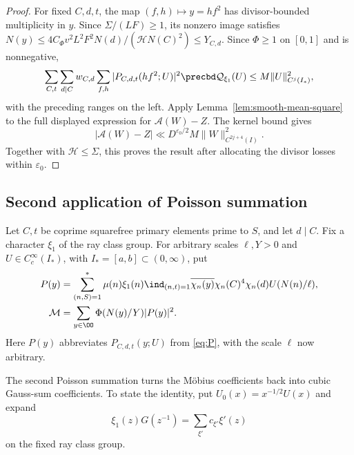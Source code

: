 \begin{proof}
For fixed $C,d,t$, the map $(f,h)\mapsto y=hf^2$ has
divisor-bounded multiplicity in $y$. Since $\Sigma/(LF)\ge1$, its
nonzero image satisfies
$N(y)\le4C_\Phi v^2L^2F^2N(d)/(\mathcal H N(C)^2)\le Y_{C,d}$.
Since $\Phi\ge1$ on $[0,1]$ and is nonnegative,
\[
 \sum_{C,t}\sum_{d\mid C}w_{C,d}\sum_{f,h}|P_{C,d,t}(hf^2;U)|^2
 \precbd\mathcal Q_{\xi_1}(U)
 \le M\|U\|_{C^j(I_*)}^2,
\]
with the preceding ranges on the left. Apply
Lemma~\ref{lem:smooth-mean-square} to the full displayed expression
for $\mathcal A(W)-Z$. The kernel bound gives
\[
 |\mathcal A(W)-Z|
 \ll D^{\varepsilon_0/2}M\|W\|_{C^{2j+4}(I)}^2.
\]
Together with $\mathcal H\le\Sigma$, this proves the result after
allocating the divisor losses within $\varepsilon_0$.
\end{proof}

\subsection{Second application of Poisson summation}

Let $C,t$ be coprime squarefree primary elements prime to $S$, and let
$d\mid C$. Fix a character $\xi_1$ of the ray class group.
For arbitrary scales $\ell,Y>0$ and
$U\in C_c^\infty(I_*)$, with
$I_*=[a,b]\subset(0,\infty)$, put
\begin{equation}\label{eq:common-mobius-sum}
 \begin{aligned}
 P(y)&=\sum_{(n,S)=1}^*\mu(n)\xi_1(n)\ind_{(n,t)=1}
 \overline{\chi_n(y)}\chi_n(C)^4\chi_n(d)U(N(n)/\ell),\\
 \mathcal M&=\sum_{y\in\OO}\Phi(N(y)/Y)|P(y)|^2.
 \end{aligned}
\end{equation}
Here $P(y)$ abbreviates $P_{C,d,t}(y;U)$ from \eqref{eq:P}, with the scale $\ell$ now arbitrary.

The second Poisson summation turns the M\"obius coefficients back into
cubic Gauss-sum coefficients. To state the identity, put
$U_0(x)=x^{-1/2}U(x)$ and expand
\[
 \xi_1(z)G(z^{-1})=\sum_{\xi'}c_{\xi'}\xi'(z)
\]
on the fixed ray class group.

